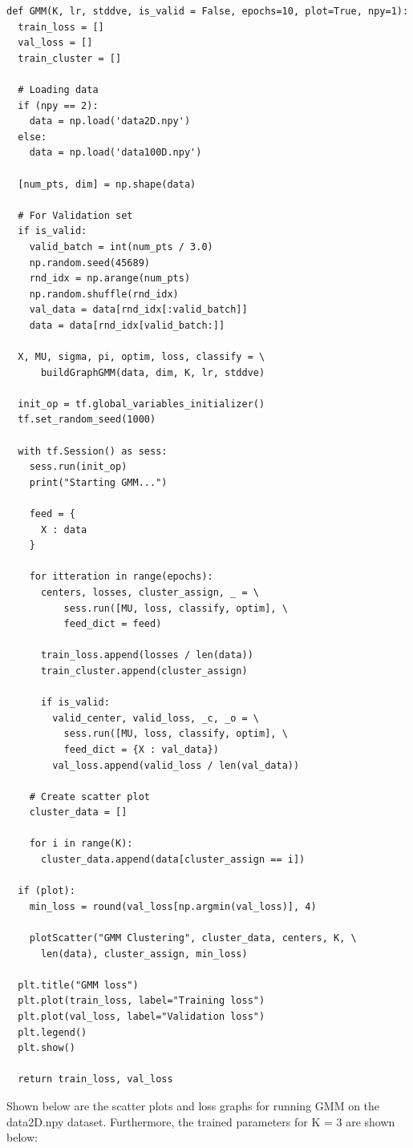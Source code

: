 \documentclass[12pt]{article}
\begin{document}
\begin{verbatim}
def GMM(K, lr, stddve, is_valid = False, epochs=10, plot=True, npy=1):
  train_loss = []
  val_loss = []
  train_cluster = []

  # Loading data
  if (npy == 2):
    data = np.load('data2D.npy')
  else:
    data = np.load('data100D.npy')
  
  [num_pts, dim] = np.shape(data)

  # For Validation set
  if is_valid:
    valid_batch = int(num_pts / 3.0)
    np.random.seed(45689)
    rnd_idx = np.arange(num_pts)
    np.random.shuffle(rnd_idx)
    val_data = data[rnd_idx[:valid_batch]]
    data = data[rnd_idx[valid_batch:]]
  
  X, MU, sigma, pi, optim, loss, classify = \
      buildGraphGMM(data, dim, K, lr, stddve)

  init_op = tf.global_variables_initializer()
  tf.set_random_seed(1000)

  with tf.Session() as sess:
    sess.run(init_op)
    print("Starting GMM...")

    feed = {
      X : data
    }

    for itteration in range(epochs):
      centers, losses, cluster_assign, _ = \
          sess.run([MU, loss, classify, optim], \
          feed_dict = feed)

      train_loss.append(losses / len(data))
      train_cluster.append(cluster_assign)

      if is_valid:
        valid_center, valid_loss, _c, _o = \
          sess.run([MU, loss, classify, optim], \
          feed_dict = {X : val_data})
        val_loss.append(valid_loss / len(val_data))
    
    # Create scatter plot
    cluster_data = []
    
    for i in range(K):
      cluster_data.append(data[cluster_assign == i])

  if (plot):  
    min_loss = round(val_loss[np.argmin(val_loss)], 4)

    plotScatter("GMM Clustering", cluster_data, centers, K, \ 
      len(data), cluster_assign, min_loss)

  plt.title("GMM loss")
  plt.plot(train_loss, label="Training loss")
  plt.plot(val_loss, label="Validation loss")
  plt.legend()
  plt.show()

  return train_loss, val_loss
\end{verbatim}

Shown below are the scatter plots and loss graphs for running GMM on the data2D.npy
dataset. Furthermore, the trained parameters for K = 3 are shown below:
\end{document}
